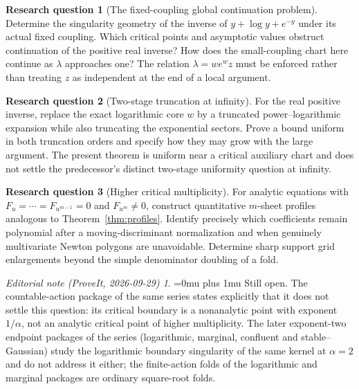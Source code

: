 \documentclass[11pt,a4paper]{article}
\theoremstyle{definition}
\newtheorem{question}{Research question}[section]
\theoremstyle{remark}
\newtheorem*{ednoteinner}{Editorial note (ProveIt, 2026-09-29)}
\newenvironment{ednote}{\begin{ednoteinner}\sloppy\Urlmuskip=0mu plus 1mu\relax}{\end{ednoteinner}}
\begin{document}
\begin{question}[The fixed-coupling global continuation problem]
Determine the singularity geometry of the inverse of
$y+\log y+e^{-y}$ under its actual fixed coupling. Which critical points
and asymptotic values obstruct continuation of the positive real inverse?
How does the small-coupling chart here continue as $\lambda$ approaches
one? The relation $\lambda=we^wz$ must be enforced rather than treating
$z$ as independent at the end of a local argument.
\end{question}

\begin{question}[Two-stage truncation at infinity]
For the real positive inverse, replace the exact logarithmic core $w$ by
a truncated power--logarithmic expansion while also truncating the
exponential sectors. Prove a bound uniform in both truncation orders and
specify how they may grow with the large argument. The present theorem
is uniform near a critical auxiliary chart and does not settle the
predecessor's distinct two-stage uniformity question at infinity.
\end{question}

\begin{question}[Higher critical multiplicity]
For analytic equations with $F_u=\cdots=F_{u^{m-1}}=0$ and
$F_{u^m}\ne0$, construct quantitative $m$-sheet profiles analogous to
Theorem~\ref{thm:profiles}. Identify precisely which coefficients remain
polynomial after a moving-discriminant normalization and when genuinely
multivariate Newton polygons are unavoidable. Determine sharp support
grid enlargements beyond the simple denominator doubling of a fold.
\end{question}
\begin{ednote}
Still open. The countable-action package
 of the same
series states explicitly that it does not settle this question: its critical
boundary is a nonanalytic point with exponent $1/\alpha$, not an analytic
critical point of higher multiplicity. The later exponent-two endpoint
packages of the series (logarithmic, marginal, confluent and stable--Gaussian)
study the logarithmic boundary singularity of the same kernel at
$\alpha=2$ and do not address it either; the finite-action folds of the
logarithmic and marginal packages are ordinary square-root folds.
\end{ednote}
\end{document}
